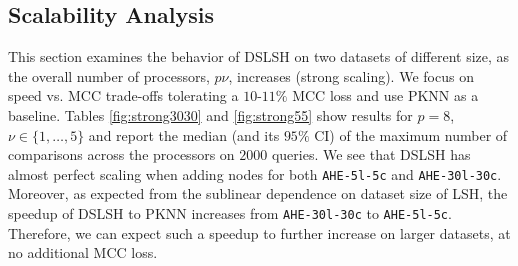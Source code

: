 \documentclass{article}
\begin{document}
\subsection{Scalability Analysis}
\label{scalability}
 
This section examines the behavior of DSLSH on two datasets of different size, as the overall number of processors, $p \nu$, increases (strong scaling). 
We focus on speed vs. MCC trade-offs tolerating a $10$-$11\%$ MCC loss and use PKNN as a baseline.
Tables \ref{fig:strong3030} and \ref{fig:strong55} show results for $p=8$, $\nu \in \{1,\dots, 5\}$ and report the median (and its $95\%$ CI) of the maximum number of comparisons across the processors on $2000$ queries.
We see that DSLSH has almost perfect scaling when adding nodes for both \texttt{AHE-5l-5c} and \texttt{AHE-30l-30c}. %
Moreover, as expected from the sublinear dependence on dataset size of LSH, the speedup of DSLSH to PKNN increases from \texttt{AHE-30l-30c} to \texttt{AHE-5l-5c}. Therefore, we can expect such a speedup to further increase on larger datasets, at no additional MCC loss.
\end{document}
